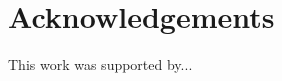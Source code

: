 \documentclass[a4paper,fleqn]{cas-dc}
\begin{document}


\section*{Acknowledgements}
This work was supported by...




%
%
%
%
%
%
%
%




\end{document}
